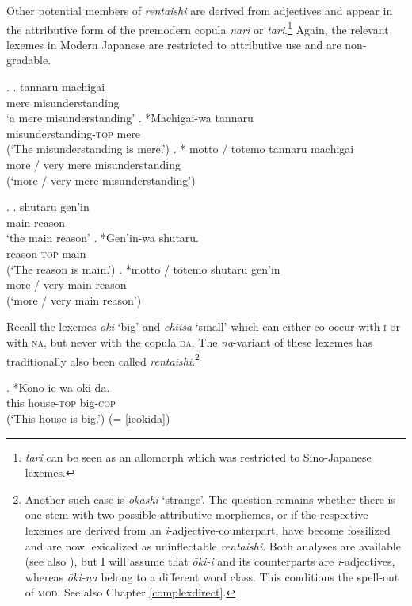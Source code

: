 \documentclass [output=book,colorlinks,citecolor=brown]{langscibook}
\begin{document}
Other potential members of \textit{rentaishi} are derived from adjectives and appear in the attributive form of the premodern copula \textit{nari} or \textit{tari}.\footnote{\textit{tari} can be seen as an allomorph which was restricted to Sino-Japanese lexemes.} Again, the relevant lexemes in Modern Japanese are restricted to attributive use and are non-gradable.

\newpage

\ex. \ag. tannaru machigai\\
mere misunderstanding\\
`a mere misunderstanding'
\bg. *Machigai-wa tannaru\\
misunderstanding-\textsc{top} mere\\
(`The misunderstanding is mere.’)
\cg. * motto / totemo tannaru machigai\\
more / very mere misunderstanding\\
(`more / very mere misunderstanding’)

\ex. \ag. shutaru gen'in\\
main reason\\
`the main reason'
\bg. *Gen'in-wa shutaru.\\
reason-\textsc{top} main\\
(`The reason is main.’)
\cg. *motto / totemo shutaru gen'in\\
more / very main reason\\
(`more / very main reason’)

Recall the lexemes \textit{ōki} `big' and \textit{chiisa} `small’ which can either co-occur with \textsc{i} or with \textsc{na}, but never with the copula \textsc{da}. The \textit{na}-variant of these lexemes has traditionally also been called \textit{rentaishi}.\footnote{Another such case is \textit{okashi} `strange’. The question remains whether there is one stem with two possible attributive morphemes, or if the respective lexemes are derived from an \textit{i}-adjective-counterpart, have become fossilized and are now lexicalized as uninflectable \textit{rentaishi}. Both analyses are available (see also \citealt[Fn. 15]{oshima:2021:nihongo}), but I will assume that \textit{ōki-i} and its counterparts are \textit{i}-adjectives, whereas \textit{ōki-na} belong to a different word class. This conditions the spell-out of \textsc{mod}. See also Chapter \ref{complexdirect}.} %

\exg. *Kono ie-wa ōki-da.\\
this house-\textsc{top} big-\textsc{cop}\\
(`This house is big.’) (= \ref{ieokida})
\end{document}

